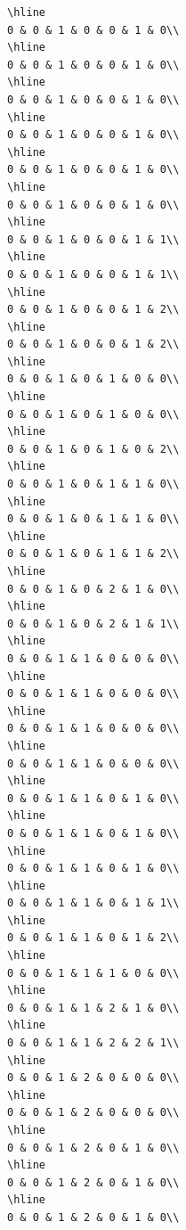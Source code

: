 \documentclass[
]{article}
\begin{document}
\begin{verbatim}
\hline
0 & 0 & 1 & 0 & 0 & 1 & 0\\
\hline
0 & 0 & 1 & 0 & 0 & 1 & 0\\
\hline
0 & 0 & 1 & 0 & 0 & 1 & 0\\
\hline
0 & 0 & 1 & 0 & 0 & 1 & 0\\
\hline
0 & 0 & 1 & 0 & 0 & 1 & 0\\
\hline
0 & 0 & 1 & 0 & 0 & 1 & 0\\
\hline
0 & 0 & 1 & 0 & 0 & 1 & 1\\
\hline
0 & 0 & 1 & 0 & 0 & 1 & 1\\
\hline
0 & 0 & 1 & 0 & 0 & 1 & 2\\
\hline
0 & 0 & 1 & 0 & 0 & 1 & 2\\
\hline
0 & 0 & 1 & 0 & 1 & 0 & 0\\
\hline
0 & 0 & 1 & 0 & 1 & 0 & 0\\
\hline
0 & 0 & 1 & 0 & 1 & 0 & 2\\
\hline
0 & 0 & 1 & 0 & 1 & 1 & 0\\
\hline
0 & 0 & 1 & 0 & 1 & 1 & 0\\
\hline
0 & 0 & 1 & 0 & 1 & 1 & 2\\
\hline
0 & 0 & 1 & 0 & 2 & 1 & 0\\
\hline
0 & 0 & 1 & 0 & 2 & 1 & 1\\
\hline
0 & 0 & 1 & 1 & 0 & 0 & 0\\
\hline
0 & 0 & 1 & 1 & 0 & 0 & 0\\
\hline
0 & 0 & 1 & 1 & 0 & 0 & 0\\
\hline
0 & 0 & 1 & 1 & 0 & 0 & 0\\
\hline
0 & 0 & 1 & 1 & 0 & 1 & 0\\
\hline
0 & 0 & 1 & 1 & 0 & 1 & 0\\
\hline
0 & 0 & 1 & 1 & 0 & 1 & 0\\
\hline
0 & 0 & 1 & 1 & 0 & 1 & 1\\
\hline
0 & 0 & 1 & 1 & 0 & 1 & 2\\
\hline
0 & 0 & 1 & 1 & 1 & 0 & 0\\
\hline
0 & 0 & 1 & 1 & 2 & 1 & 0\\
\hline
0 & 0 & 1 & 1 & 2 & 2 & 1\\
\hline
0 & 0 & 1 & 2 & 0 & 0 & 0\\
\hline
0 & 0 & 1 & 2 & 0 & 0 & 0\\
\hline
0 & 0 & 1 & 2 & 0 & 1 & 0\\
\hline
0 & 0 & 1 & 2 & 0 & 1 & 0\\
\hline
0 & 0 & 1 & 2 & 0 & 1 & 0\\

\end{verbatim}
\end{document}
